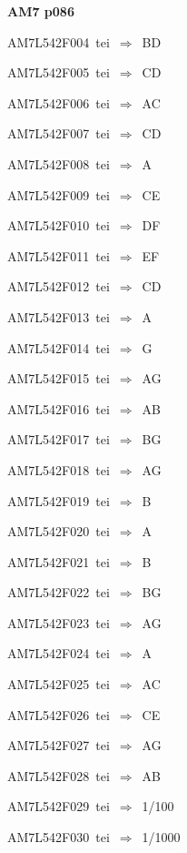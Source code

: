 \par\vfill\eject
{\bf\hfill AM7 p086\hfill\hbox{}}\par\bigskip
{\sixrm AM7L542F004\ {\sixit tei}\ }$\Rightarrow$\ BD\par\smallskip
{\sixrm AM7L542F005\ {\sixit tei}\ }$\Rightarrow$\ CD\par\smallskip
{\sixrm AM7L542F006\ {\sixit tei}\ }$\Rightarrow$\ AC\par\smallskip
{\sixrm AM7L542F007\ {\sixit tei}\ }$\Rightarrow$\ CD\par\smallskip
{\sixrm AM7L542F008\ {\sixit tei}\ }$\Rightarrow$\ A\par\smallskip
{\sixrm AM7L542F009\ {\sixit tei}\ }$\Rightarrow$\ CE\par\smallskip
{\sixrm AM7L542F010\ {\sixit tei}\ }$\Rightarrow$\ DF\par\smallskip
{\sixrm AM7L542F011\ {\sixit tei}\ }$\Rightarrow$\ EF\par\smallskip
{\sixrm AM7L542F012\ {\sixit tei}\ }$\Rightarrow$\ CD\par\smallskip
{\sixrm AM7L542F013\ {\sixit tei}\ }$\Rightarrow$\ A\par\smallskip
{\sixrm AM7L542F014\ {\sixit tei}\ }$\Rightarrow$\ G\par\smallskip
{\sixrm AM7L542F015\ {\sixit tei}\ }$\Rightarrow$\ AG\par\smallskip
{\sixrm AM7L542F016\ {\sixit tei}\ }$\Rightarrow$\ AB\par\smallskip
{\sixrm AM7L542F017\ {\sixit tei}\ }$\Rightarrow$\ BG\par\smallskip
{\sixrm AM7L542F018\ {\sixit tei}\ }$\Rightarrow$\ AG\par\smallskip
{\sixrm AM7L542F019\ {\sixit tei}\ }$\Rightarrow$\ B\par\smallskip
{\sixrm AM7L542F020\ {\sixit tei}\ }$\Rightarrow$\ A\par\smallskip
{\sixrm AM7L542F021\ {\sixit tei}\ }$\Rightarrow$\ B\par\smallskip
{\sixrm AM7L542F022\ {\sixit tei}\ }$\Rightarrow$\ BG\par\smallskip
{\sixrm AM7L542F023\ {\sixit tei}\ }$\Rightarrow$\ AG\par\smallskip
{\sixrm AM7L542F024\ {\sixit tei}\ }$\Rightarrow$\ A\par\smallskip
{\sixrm AM7L542F025\ {\sixit tei}\ }$\Rightarrow$\ AC\par\smallskip
{\sixrm AM7L542F026\ {\sixit tei}\ }$\Rightarrow$\ CE\par\smallskip
{\sixrm AM7L542F027\ {\sixit tei}\ }$\Rightarrow$\ AG\par\smallskip
{\sixrm AM7L542F028\ {\sixit tei}\ }$\Rightarrow$\ AB\par\smallskip
{\sixrm AM7L542F029\ {\sixit tei}\ }$\Rightarrow$\ 1/100\par\smallskip
{\sixrm AM7L542F030\ {\sixit tei}\ }$\Rightarrow$\ 1/1000\par\smallskip

